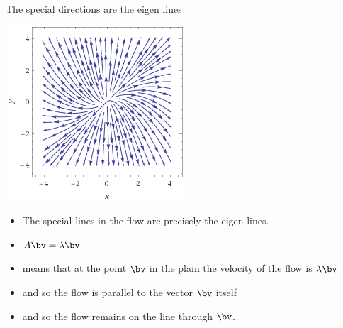 \documentclass{beamer}
\begin{document}
\begin{frame}{The special directions are the eigen lines}


\begin{center}
\includegraphics[scale=0.45]{stream1}
\end{center}

\begin{itemize}
\item The special lines in the flow are precisely the eigen lines.
\item $A\bv=\lambda\bv$
\item means that at the point $\bv$ in the plain the velocity of the flow is $\lambda\bv$
\item and so the flow is parallel to the vector $\bv$ itself
\item and so the flow remains on the line through $\bv$.
\end{itemize}
\end{frame}

\end{document}
